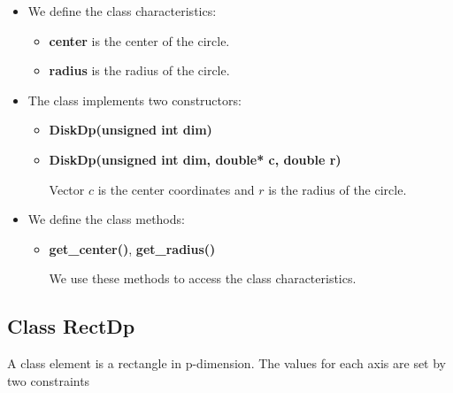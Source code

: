 \documentclass{report}
\begin{document}
	\begin{itemize}
		\item We define the class characteristics: 
		\begin{itemize}
			\item {\bfseries center}  is the center of the circle.
		
			\item {\bfseries radius}  is  the radius of the circle.
		\end{itemize}
	
		\item The class implements two constructors:
		\begin{itemize}
			\item {\bfseries DiskDp(unsigned int dim)}
		
			\item {\bfseries DiskDp(unsigned int dim, double* c, double r)}
		
			Vector $c$ is the center coordinates and $r$ is  the radius of the circle. 
		\end{itemize}
	
		\item We define the class methods:
	
		\begin{itemize}
			\item {\bfseries get\_center()}, {\bfseries get\_radius()}
			
			We use these  methods to access the class characteristics.
		\end{itemize}
	\end{itemize}
	
	\subsection*{Class RectDp}
	\label{RectDp}
	
	A class element is a rectangle in p-dimension. The values for each axis are set by two constraints 
		
\end{document}
